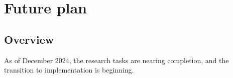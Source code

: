 \chapter{Future plan}

\section{Overview}
As of December 2024, the research tasks are nearing completion, and the transition to implementation is beginning.


    
    

    
    
